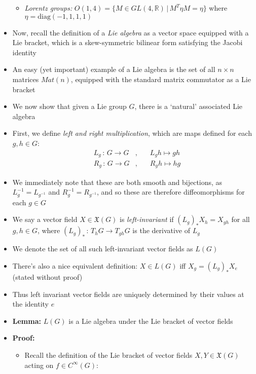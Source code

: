 \documentclass[12pt,a4paper]{article}
\numberwithin{equation}{section}
\begin{document}
\begin{itemize}
\begin{itemize}
			\item \textit{Lorentz groups:} $O(1,4)=\{M\in GL(4,\mathbb{R})\,|\,M^{T}\eta M=\eta\}$ where $\eta=\text{diag}(-1,1,1,1)$
		\end{itemize}
		\item Now, recall the definition of a \textit{Lie algebra} as a vector space equipped with a Lie bracket, which is a skew-symmetric bilinear form satisfying the Jacobi identity
		\item An easy (yet important) example of a Lie algebra is the set of all $n\times n$ matrices $Mat(n)$, equipped with the standard matrix commutator as a Lie bracket
		\item We now show that given a Lie group $G$, there is a `natural' associated Lie algebra
		\item First, we define \textit{left and right multiplication}, which are maps defined for each $g,h\in G$:
		\begin{equation}
			\begin{aligned}
				&L_{g}\,:\,G\to G&,\quad &L_{g}h\mapsto gh\\&R_{g}\,:\,G\to G&,\quad &R_{g}h\mapsto hg
			\end{aligned}
		\end{equation}
		\item We immediately note that these are both smooth and bijections, as $L^{-1}_{g}=L_{g^{-1}}$ and $R^{-1}_{g}=R_{g^{-1}}$, and so these are therefore diffeomorphisms for each $g\in G$
		\item We say a vector field $X\in \mathfrak{X}(G)$ is \textit{left-invariant} if $(L_{g})_{*}X_{h}=X_{gh}$ for all $g,h\in G$, where $(L_{g})_{*}\,:\,T_{h}G\to T_{gh}G$ is the derivative of $L_{g}$
		\item We denote the set of all such left-invariant vector fields as $L(G)$
		\item There's also a nice equivalent definition: $X\in L(G)$ iff $X_{g}=(L_{g})_{*}X_{e}$ (stated without proof)
		\item Thus left invariant vector fields are uniquely determined by their values at the identity $e$
		\item \textbf{Lemma:} $L(G)$ is a Lie algebra under the Lie bracket of vector fields
		\item \textbf{Proof:}
		\begin{itemize}
			\item Recall the definition of the Lie bracket of vector fields $X,Y\in\mathfrak{X}(G)$ acting on $f\in C^{\infty}(G)$:
			\begin{equation}

\end{equation}
\end{itemize}
\end{itemize}
\end{document}
